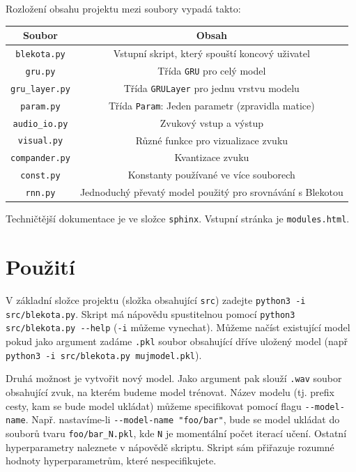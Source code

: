 \documentclass[a4]{article}
\begin{document}
Rozložení obsahu projektu mezi soubory vypadá takto:

\begin{center}
\begin{tabular}{ |c|c| }
\hline
Soubor              & Obsah \\ \hline \hline
\verb|blekota.py|   & Vstupní skript, který spouští koncový uživatel \\ \hline
\verb|gru.py|       & Třída \verb|GRU| pro celý model \\ \hline
\verb|gru_layer.py| & Třída \verb|GRULayer| pro jednu vrstvu modelu  \\ \hline
\verb|param.py|     & Třída \verb|Param|: Jeden parametr (zpravidla matice) \\ \hline
\verb|audio_io.py|  & Zvukový vstup a výstup \\ \hline
\verb|visual.py|    & Různé funkce pro vizualizace zvuku \\ \hline
\verb|compander.py| & Kvantizace zvuku \\ \hline
\verb|const.py|     & Konstanty používané ve více souborech \\ \hline
\verb|rnn.py|       & Jednoduchý převatý model použitý pro srovnávání s Blekotou \\ \hline

\end{tabular}
\end{center}

Techničtější dokumentace je ve složce \verb|sphinx|. Vstupní stránka je \verb|modules.html|.

\section{Použití}
V základní složce projektu (složka obsahující \verb|src|) zadejte \verb|python3 -i src/blekota.py|. Skript má nápovědu  spustitelnou pomocí \verb|python3 src/blekota.py --help| (\verb|-i| můžeme vynechat). Můžeme načíst existující model pokud jako argument zadáme \verb|.pkl| soubor obsahující dříve uložený model (např \verb|python3 -i src/blekota.py mujmodel.pkl|).

Druhá možnost je vytvořit nový model. Jako argument pak slouží \verb|.wav| soubor obsahující zvuk, na kterém budeme model trénovat. Název modelu (tj. prefix cesty, kam se bude model ukládat) můžeme specifikovat pomocí flagu \verb|--model-name|. Např. nastavíme-li \verb|--model-name "foo/bar"|, bude se model ukládat do souborů tvaru \verb|foo/bar_N.pkl|, kde \verb|N| je momentální počet iterací učení. Ostatní hyperparametry naleznete v nápovědě skriptu. Skript sám přiřazuje rozumné hodnoty hyperparametrům, které nespecifikujete.
\end{document}
